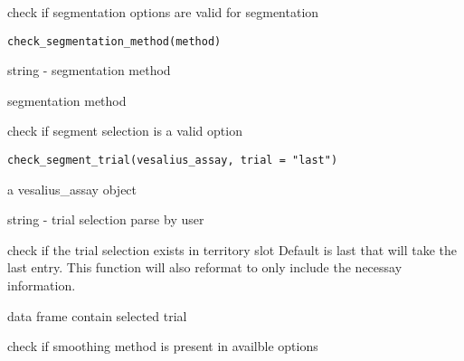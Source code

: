 \documentclass[a4paper]{book}
\begin{document}
\begin{Description}
check if segmentation options are valid for segmentation
\end{Description}
%
\begin{Usage}
\begin{verbatim}
check_segmentation_method(method)
\end{verbatim}
\end{Usage}
%
\begin{Arguments}
\begin{ldescription}
\item[\code{method}] string - segmentation method
\end{ldescription}
\end{Arguments}
%
\begin{Value}
segmentation method
\end{Value}
%
\begin{Description}
check if segment selection is a valid option
\end{Description}
%
\begin{Usage}
\begin{verbatim}
check_segment_trial(vesalius_assay, trial = "last")
\end{verbatim}
\end{Usage}
%
\begin{Arguments}
\begin{ldescription}
\item[\code{vesalius\_assay}] a vesalius\_assay object

\item[\code{trial}] string - trial selection parse by user
\end{ldescription}
\end{Arguments}
%
\begin{Details}
check if the trial selection exists in territory slot
Default is last that will take the last entry. This function
will also reformat to only include the necessay information.
\end{Details}
%
\begin{Value}
data frame contain selected trial
\end{Value}
%
\begin{Description}
check if smoothing method is present in availble options
\end{Description}
\end{document}
